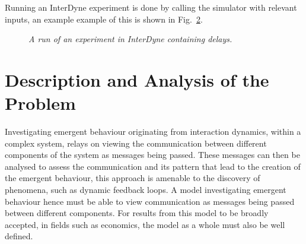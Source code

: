 \documentclass{article}
\begin{document}

\begin{figure}[H]
	\centering
	\caption{\it }
	\label{fig:intersimfun}
\end{figure} 




Running an InterDyne experiment is done by calling the simulator with relevant inputs, an example example of this is shown in Fig.~\ref{fig:runninginterdyne}.
\begin{figure}[H]
	\centering
        
	\caption{\it A run of an experiment in InterDyne containing delays.}
	\label{fig:runninginterdyne}
\end{figure} 









\section {Description and Analysis of the Problem} \label{despriptionandanalysproblem}

Investigating emergent behaviour originating from interaction dynamics, within a complex system, relays on viewing the communication between different components of the system as messages being passed. These messages can then be analysed to assess the communication and its pattern that lead to the creation of the emergent behaviour, this approach is amenable to the discovery of phenomena, such as dynamic feedback loops. A model investigating emergent behaviour hence must be able to view communication as messages being passed between different components. For results from this model to be broadly accepted, in fields such as economics, the model as a whole must also be well defined.      
\end{document}
